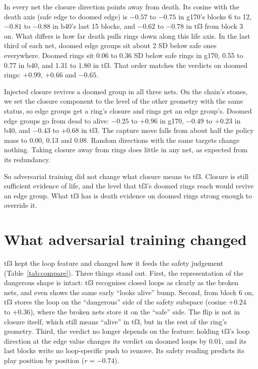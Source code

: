 \documentclass[11pt]{article}
\newcommand{\pos}[1]{$+#1$}
\newcommand{\nega}[1]{$-#1$}
\begin{document}
In every net the closure direction points away from death. Its cosine with the death axis (safe edge to doomed edge) is \nega{0.57} to \nega{0.75} in g170's blocks 6 to 12, \nega{0.81} to \nega{0.88} in b40's last 15 blocks, and \nega{0.62} to \nega{0.78} in tf3 from block 3 on. What differs is how far death pulls rings down along this life axis. In the last third of each net, doomed edge groups sit about 2 SD below safe ones everywhere. Doomed rings sit 0.06 to 0.36 SD below safe rings in g170, 0.55 to 0.77 in b40, and 1.31 to 1.80 in tf3. That order matches the verdicts on doomed rings: \pos{0.99}, \pos{0.66} and \nega{0.65}.

Injected closure revives a doomed group in all three nets. On the chain's stones, we set the closure component to the level of the other geometry with the same status, so edge groups get a ring's closure and rings get an edge group's. Doomed edge groups go from dead to alive: \nega{0.25} to \pos{0.96} in g170, \nega{0.49} to \pos{0.23} in b40, and \nega{0.43} to \pos{0.68} in tf3. The capture move falls from about half the policy mass to 0.00, 0.13 and 0.08. Random directions with the same targets change nothing. Taking closure away from rings does little in any net, as expected from its redundancy.

So adversarial training did not change what closure means to tf3. Closure is still sufficient evidence of life, and the level that tf3's doomed rings reach would revive an edge group. What tf3 has is death evidence on doomed rings strong enough to override it.

\section{What adversarial training changed}
\label{sec:adv}

tf3 kept the loop feature and changed how it feeds the safety judgement (Table~\ref{tab:compare}). Three things stand out. First, the representation of the dangerous shape is intact: tf3 recognises closed loops as clearly as the broken nets, and even shows the same early ``looks alive'' bump. Second, from block 6 on, tf3 stores the loop on the ``dangerous'' side of the safety subspace (cosine \pos{0.24} to \pos{0.36}), where the broken nets store it on the ``safe'' side. The flip is not in closure itself, which still means ``alive'' in tf3, but in the rest of the ring's geometry. Third, the verdict no longer depends on the feature: holding tf3's loop direction at the edge value changes its verdict on doomed loops by 0.01, and its last blocks write no loop-specific push to remove. Its safety reading predicts its play position by position ($r = -0.74$).
\end{document}
